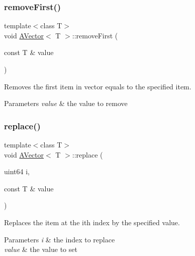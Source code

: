 \subsubsection{\texorpdfstring{removeFirst()}{removeFirst()}}
{\footnotesize\ttfamily template$<$class T$>$ \\
void \mbox{\hyperlink{class_a_vector}{A\+Vector}}$<$ T $>$\+::remove\+First (\begin{DoxyParamCaption}\item[{const T \&}]{value }\end{DoxyParamCaption})}



Removes the first item in vector equals to the specified item. 


\begin{DoxyParams}{Parameters}
{\em value} & the value to remove \\
\hline
\end{DoxyParams}
\mbox{\label{class_a_vector_ae2ab95fcb42489ddfbf1bfa5a12867a8}} 
\subsubsection{\texorpdfstring{replace()}{replace()}}
{\footnotesize\ttfamily template$<$class T$>$ \\
void \mbox{\hyperlink{class_a_vector}{A\+Vector}}$<$ T $>$\+::replace (\begin{DoxyParamCaption}\item[{uint64}]{i,  }\item[{const T \&}]{value }\end{DoxyParamCaption})}



Replaces the item at the ith index by the specified value. 


\begin{DoxyParams}{Parameters}
{\em i} & the index to replace \\
\hline
{\em value} & the value to set \\
\hline
\end{DoxyParams}
\mbox{\label{class_a_vector_a7cc825790e29f58f9425fd11efbdbbab}} 
